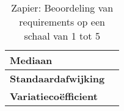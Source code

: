 \begin{table}[htbp]
{\begin{tabular}{|ll|}
    \multicolumn{1}{|l|}{\textbf{Mediaan}}                                                                                                                                                                                     &                              \\ \hline
    \multicolumn{1}{|l|}{\textbf{Standaardafwijking}}                                                                                                                                                                          &                              \\ \hline
    \multicolumn{1}{|l|}{\textbf{Variatiecoëfficient}}                                                                                                                                                                         &                              \\ \hline
    \end{tabular}%
    }
    \caption{Zapier: Beoordeling van requirements op een schaal van 1 tot 5}
    \end{table}